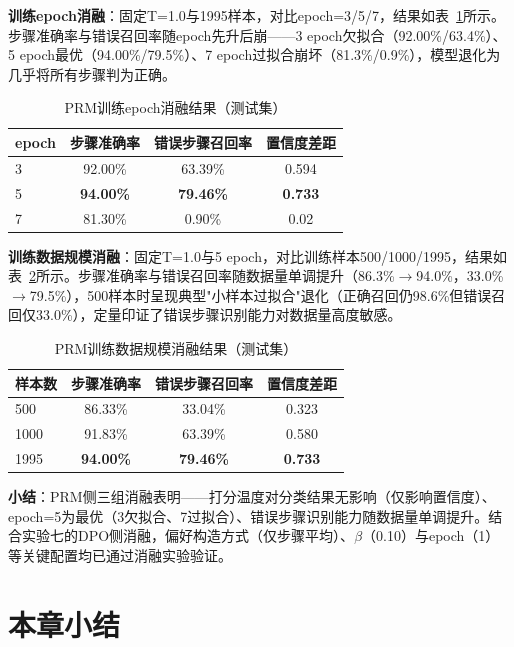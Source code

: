 \documentclass[professional,privacy,print,win,long,STEM,AutoFakeBold]{def/buaa}
\begin{document}
\textbf{训练epoch消融}：固定T=1.0与1995样本，对比epoch=3/5/7，结果如表~\ref{tab:abl-epoch-prm}所示。步骤准确率与错误召回率随epoch先升后崩——3 epoch欠拟合（92.00\%/63.4\%）、5 epoch最优（94.00\%/79.5\%）、7 epoch过拟合崩坏（81.3\%/0.9\%），模型退化为几乎将所有步骤判为正确。

\begin{table}[h]
\centering
\caption{PRM训练epoch消融结果（测试集）}
\label{tab:abl-epoch-prm}
\begin{tabular}{lccc}
\toprule
epoch & 步骤准确率 & 错误步骤召回率 & 置信度差距 \\
\midrule
3 & 92.00\% & 63.39\% & 0.594 \\
5 & \textbf{94.00\%} & \textbf{79.46\%} & \textbf{0.733} \\
7 & 81.30\% & 0.90\% & 0.02 \\
\bottomrule
\end{tabular}
\end{table}

\textbf{训练数据规模消融}：固定T=1.0与5 epoch，对比训练样本500/1000/1995，结果如表~\ref{tab:abl-data}所示。步骤准确率与错误召回率随数据量单调提升（86.3\%$\rightarrow$94.0\%，33.0\%$\rightarrow$79.5\%），500样本时呈现典型"小样本过拟合"退化（正确召回仍98.6\%但错误召回仅33.0\%），定量印证了错误步骤识别能力对数据量高度敏感。

\begin{table}[h]
\centering
\caption{PRM训练数据规模消融结果（测试集）}
\label{tab:abl-data}
\begin{tabular}{lccc}
\toprule
样本数 & 步骤准确率 & 错误步骤召回率 & 置信度差距 \\
\midrule
500 & 86.33\% & 33.04\% & 0.323 \\
1000 & 91.83\% & 63.39\% & 0.580 \\
1995 & \textbf{94.00\%} & \textbf{79.46\%} & \textbf{0.733} \\
\bottomrule
\end{tabular}
\end{table}

\textbf{小结}：PRM侧三组消融表明——打分温度对分类结果无影响（仅影响置信度）、epoch=5为最优（3欠拟合、7过拟合）、错误步骤识别能力随数据量单调提升。结合实验七的DPO侧消融，偏好构造方式（仅步骤平均）、$\beta$（0.10）与epoch（1）等关键配置均已通过消融实验验证。

\section{本章小结}
\end{document}
